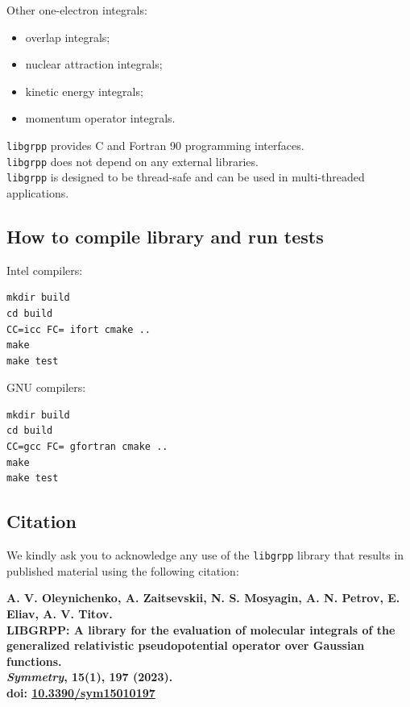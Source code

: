 \documentclass[12pt]{article}
\begin{document}
\noindent
Other one-electron integrals:

\begin{itemize}
\item overlap integrals;
\item nuclear attraction integrals;
\item kinetic energy integrals;
\item momentum operator integrals.
\end{itemize}

\noindent
\texttt{libgrpp} provides C and Fortran 90 programming interfaces. \\
\texttt{libgrpp} does not depend on any external libraries. \\
\texttt{libgrpp} is designed to be thread-safe and can be used in multi-threaded applications.

\subsection{How to compile library and run tests}

Intel compilers:

\begin{lstlisting}
mkdir build
cd build
CC=icc FC= ifort cmake ..
make
make test
\end{lstlisting}

\noindent
GNU compilers:

\begin{lstlisting}
mkdir build
cd build
CC=gcc FC= gfortran cmake ..
make
make test
\end{lstlisting}


\subsection{Citation}

We kindly ask you to acknowledge any use of the \texttt{libgrpp} library that results in published material using the following citation:

\bigskip

\noindent
\textbf{A. V. Oleynichenko, A. Zaitsevskii, N. S. Mosyagin, A. N. Petrov, E. Eliav, A. V. Titov. \\
LIBGRPP: A library for the evaluation of molecular integrals of the generalized relativistic pseudopotential operator over Gaussian functions. \\
\textit{Symmetry}, 15(1), 197 (2023). \\
doi: \href{https://dx.doi.org/10.3390/sym15010197}{10.3390/sym15010197}
}
\end{document}
